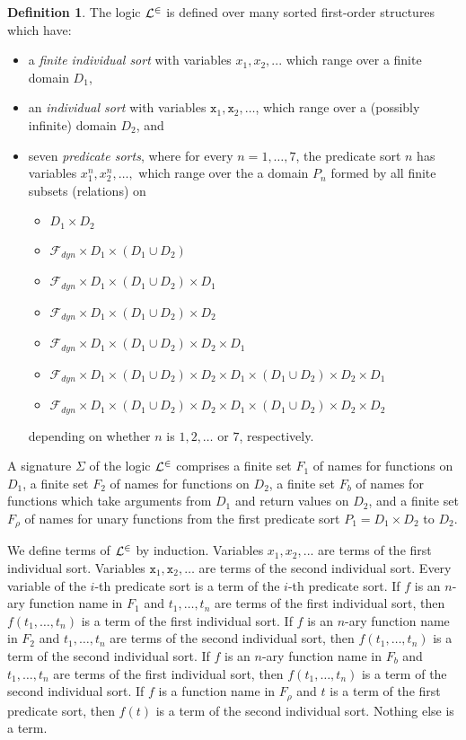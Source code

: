 \documentclass[preprint,11pt]{elsarticle}
\theoremstyle{definition}
\newtheorem{definition}{Definition}[section]
\theoremstyle{remark}
\begin{document}
\begin{definition}\label{LinDef}
The logic ${\cal L}^\in$ is defined over many sorted first-order structures which have:
\begin{itemize}
\item a \emph{finite individual sort} with variables $x_1,x_2,...$ which range over a finite domain $D_1$,
\item an \emph{individual sort} with variables $\mathtt{x}_1, \mathtt{x}_2, \ldots$, which range over a (possibly infinite) domain $D_2$, and
\item seven \emph{predicate sorts}, where for every $n = 1, \ldots, 7$, the predicate sort $n$ has variables $x^n_1, x^n_2, \ldots,$ which range over the a domain $P_n$ formed by all finite subsets (relations) on
\begin{itemize}
\item $D_1 \times D_2$
\item $\mathcal{F}_{dyn} \times D_1 \times (D_1 \cup D_2)$
\item $\mathcal{F}_{dyn} \times D_1 \times (D_1 \cup D_2) \times D_1$
\item $\mathcal{F}_{dyn} \times D_1 \times (D_1 \cup D_2) \times D_2$
\item $\mathcal{F}_{dyn} \times D_1 \times (D_1 \cup D_2) \times D_2 \times D_1$
\item $\mathcal{F}_{dyn} \times D_1 \times (D_1 \cup D_2) \times D_2 \times D_1 \times (D_1 \cup D_2) \times D_2 \times D_1$
\item $\mathcal{F}_{dyn} \times D_1 \times (D_1 \cup D_2) \times D_2 \times D_1 \times (D_1 \cup D_2) \times D_2 \times D_2$
\end{itemize}
depending on whether $n$ is $1, 2, \ldots$ or $7$, respectively.
\end{itemize}
A signature $\Sigma$ of the logic ${\cal L}^\in$ comprises a finite set $F_1$ of names for functions on $D_1$, a finite set $F_2$ of names for functions on $D_2$, a finite set $F_b$ of names for functions which take arguments from $D_1$ and return values on $D_2$, and a finite set $F_\rho$ of names for unary functions from the first predicate sort $P_1 = D_1 \times D_2$ to $D_2$.

We define terms of ${\cal L}^\in$  by induction. Variables $x_1,x_2,...$ are terms of the first individual sort. Variables $\mathtt{x}_1, \mathtt{x}_2, \ldots$ are terms of the second individual sort. Every variable of the $i$-th predicate sort is a term of the $i$-th predicate sort. If $f$ is an $n$-ary function name in $F_1$ and $t_1, \ldots, t_n$ are terms of the first individual sort, then $f(t_1, \ldots, t_n)$ is a term of the first individual sort. If $f$ is an $n$-ary function name in $F_2$ and $t_1, \ldots, t_n$ are terms of the second individual sort, then $f(t_1, \ldots, t_n)$ is a term of the second individual sort. If $f$ is an $n$-ary function name in $F_b$ and $t_1, \ldots, t_n$ are terms of the first individual sort, then $f(t_1, \ldots, t_n)$ is a term of the second individual sort.
If $f$ is a function name in $F_\rho$ and $t$ is a term of the first predicate sort, then $f(t)$ is a term of the second individual sort. Nothing else is a term.


\end{definition}
\end{document}
